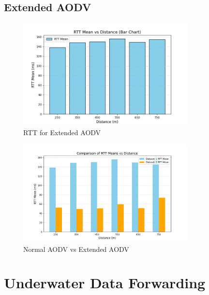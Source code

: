 \documentclass[]{nsm-thesis}
\begin{document}
\section{Extended AODV}
\begin{figure}[h!]
    \centering
    \includegraphics[width=0.8\textwidth]{image/RTT_extended.png}
    \caption{RTT for Extended AODV}
    \label{fig:rtt_extended_aodv}
\end{figure}
\begin{figure}[h!]
    \centering
    \includegraphics[width=0.8\textwidth]{image/RTTDiffernce.png}
    \caption{Normal AODV vs Extended AODV}
    \label{fig:rtt_extended_aodv}
\end{figure}

\chapter{Underwater Data Forwarding}
\end{document}

